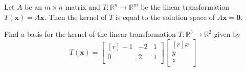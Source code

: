 \begin{corollary}\label{cor:6.7}
    Let \(A\) be an \(m\times n\) matrix and \(T:\mathbb{R}^n \to \mathbb{R}^m\) be the linear transformation \(T(\mathbf{x})=A \mathbf{x}\). Then the kernel of \(T\) is equal to the solution space of \(A \mathbf{x}=\mathbf{0}\).
\end{corollary}
\begin{exercise}
    Find a basis for the kernel of the linear transformation \(T:\mathbb{R}^3 \to \mathbb{R}^2\) given by 
    \[
        T(\mathbf{x})= \begin{bmatrix}[r]
            -1 &-2  &1   \\
             0&  2&   1\\
        \end{bmatrix} \begin{bmatrix}[r]
             x \\
             y \\
             z \\
        \end{bmatrix}
    \]
\end{exercise}
